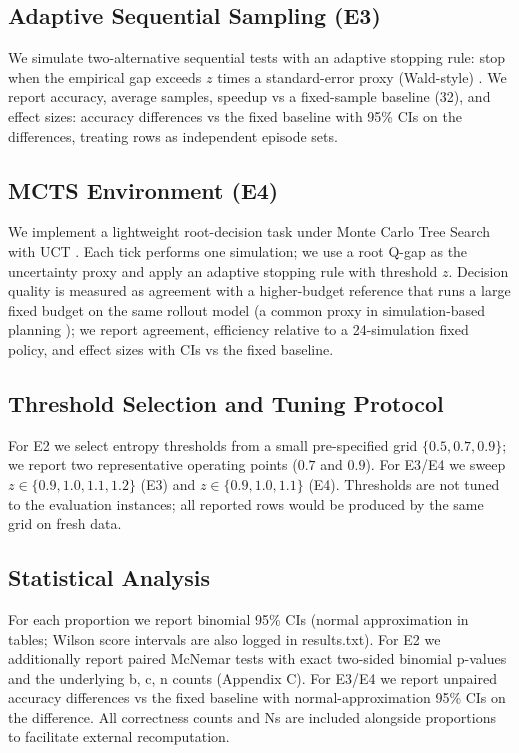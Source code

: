\subsection{Adaptive Sequential Sampling (E3)}
We simulate two-alternative sequential tests with an adaptive stopping rule: stop when the empirical gap exceeds $z$ times a standard-error proxy (Wald-style) \cite{Wald1945Sequential}. We report accuracy, average samples, speedup vs a fixed-sample baseline (32), and effect sizes: accuracy differences vs the fixed baseline with 95\% CIs on the differences, treating rows as independent episode sets.

\subsection{MCTS Environment (E4)}
We implement a lightweight root-decision task under Monte Carlo Tree Search with UCT \cite{Kocsis2006UCT}. Each tick performs one simulation; we use a root Q-gap as the uncertainty proxy and apply an adaptive stopping rule with threshold $z$. Decision quality is measured as agreement with a higher-budget reference that runs a large fixed budget on the same rollout model (a common proxy in simulation-based planning \cite{Coulom2006MCTS}); we report agreement, efficiency relative to a 24-simulation fixed policy, and effect sizes with CIs vs the fixed baseline.

\subsection{Threshold Selection and Tuning Protocol}
For E2 we select entropy thresholds from a small pre-specified grid $\{0.5, 0.7, 0.9\}$; we report two representative operating points ($0.7$ and $0.9$). For E3/E4 we sweep $z \in \{0.9, 1.0, 1.1, 1.2\}$ (E3) and $z \in \{0.9, 1.0, 1.1\}$ (E4). Thresholds are not tuned to the evaluation instances; all reported rows would be produced by the same grid on fresh data.

\subsection{Statistical Analysis}
For each proportion we report binomial 95\% CIs (normal approximation in tables; Wilson score intervals are also logged in results.txt). For E2 we additionally report paired McNemar tests with exact two-sided binomial p-values and the underlying b, c, n counts (Appendix C). For E3/E4 we report unpaired accuracy differences vs the fixed baseline with normal-approximation 95\% CIs on the difference. All correctness counts and Ns are included alongside proportions to facilitate external recomputation.

